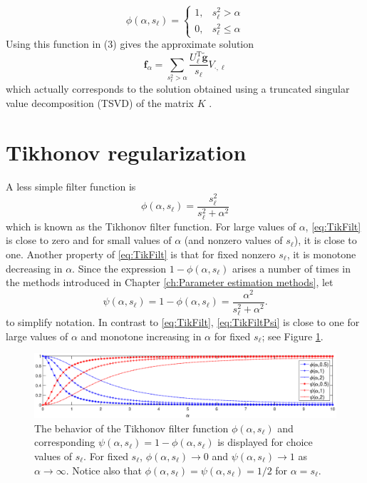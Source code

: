 \documentclass[12pt,notitlepage]{report}
\newcommand{\gnoiseVec}{\widetilde{\mathbf{g}}}	%
\newcommand{\kMat}{K}	%
\newcommand{\fVec}{\mathbf{f}}	%
\newcommand{\trans}{\mathrm{T}}	%
\newcommand{\regparam}{\alpha}
\newcommand{\filt}{\phi}
\newcommand{\mfilt}{\psi}
\newcommand{\singular}{s}	%
\begin{document}
\[\filt(\regparam,\singular_\ell) = \begin{cases}
1, & \singular_\ell^2 > \regparam \\
0, & \singular_\ell^2 \leq \regparam
\end{cases}\]
Using this function in (3) gives the approximate solution
\[\fVec_\regparam = \sum_{\singular_\ell^2 > \regparam} \frac{{U^\trans_\ell}\gnoiseVec}{\singular_\ell}V_{\cdot,\ell}\]
which actually corresponds to the solution obtained using a truncated singular value decomposition (TSVD) of the matrix $\kMat$ \cite[p.~3-5]{Vogel:2002}. \par

\section{Tikhonov regularization} \label{sec:Tikhonov reg.}

A less simple filter function is
\begin{equation}
\filt(\regparam,\singular_\ell)  = \frac{\singular_\ell^2}{\singular_\ell^2 + \regparam^2}
\label{eq:TikFilt}
\end{equation}
which is known as the Tikhonov filter function. For large values of $\regparam$, \eqref{eq:TikFilt} is close to zero and for small values of $\regparam$ (and nonzero values of $\singular_\ell$), it is close to one. Another property of \eqref{eq:TikFilt} is that for fixed nonzero $\singular_\ell$, it is monotone decreasing in $\regparam$. Since the expression $1 - \filt(\regparam,\singular_\ell)$ arises a number of times in the methods introduced in Chapter \ref{ch:Parameter estimation methods}, let
\begin{equation}
\mfilt(\regparam,\singular_\ell) = 1 - \filt(\regparam,\singular_\ell) = \frac{\regparam^2}{\singular_\ell^2 + \regparam^2}.
\label{eq:TikFiltPsi}
\end{equation}
to simplify notation. In contrast to \eqref{eq:TikFilt}, \eqref{eq:TikFiltPsi} is close to one for large values of $\regparam$ and monotone increasing in $\regparam$ for fixed $\singular_\ell$; see Figure \ref{fig:Phi Psi Plot}. \par 

\begin{figure}
	\centerline{\includegraphics[scale = 0.4]{Figures/Phi_Psi_Plot.eps}}
\caption{The behavior of the Tikhonov filter function $\filt(\regparam,\singular_\ell)$ and corresponding $\mfilt(\regparam,\singular_\ell) = 1 - \filt(\regparam,\singular_\ell)$ is displayed for choice values of $\singular_\ell$. For fixed $\singular_\ell$, $\filt(\regparam,\singular_\ell) \rightarrow 0$ and $\mfilt(\regparam,\singular_\ell) \rightarrow 1$ as $\regparam \rightarrow \infty$. Notice also that $\filt(\regparam,\singular_\ell) = \mfilt(\regparam,\singular_\ell) = 1/2$ for $\alpha = \singular_\ell$.}
\label{fig:Phi Psi Plot}
\end{figure}
\end{document}
